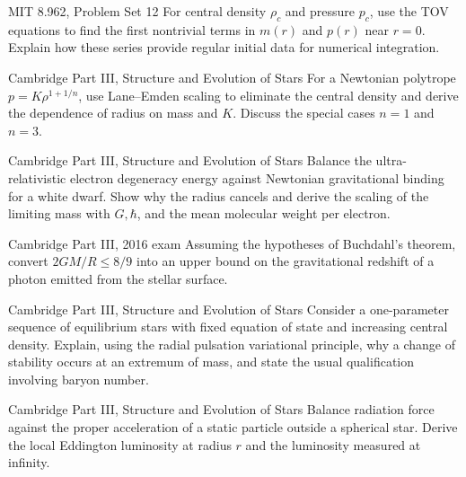 \begin{exercise}{MIT 8.962, Problem Set 12}
For central density \(\rho_c\) and pressure \(p_c\), use the TOV equations to
find the first nontrivial terms in \(m(r)\) and \(p(r)\) near \(r=0\).
Explain how these series provide regular initial data for numerical
integration.
\end{exercise}

\begin{exercise}{Cambridge Part III, Structure and Evolution of Stars}
For a Newtonian polytrope \(p=K\rho^{1+1/n}\), use Lane--Emden scaling to
eliminate the central density and derive the dependence of radius on mass and
\(K\).  Discuss the special cases \(n=1\) and \(n=3\).
\end{exercise}

\begin{exercise}{Cambridge Part III, Structure and Evolution of Stars}
Balance the ultra-relativistic electron degeneracy energy against Newtonian
gravitational binding for a white dwarf.  Show why the radius cancels and
derive the scaling of the limiting mass with \(G,\hbar\), and the mean
molecular weight per electron.
\end{exercise}

\begin{exercise}{Cambridge Part III, 2016 exam}
Assuming the hypotheses of Buchdahl's theorem, convert
\(2GM/R\leq8/9\) into an upper bound on the gravitational redshift of a photon
emitted from the stellar surface.
\end{exercise}

\begin{exercise}{Cambridge Part III, Structure and Evolution of Stars}
Consider a one-parameter sequence of equilibrium stars with fixed equation of
state and increasing central density.  Explain, using the radial pulsation
variational principle, why a change of stability occurs at an extremum of
mass, and state the usual qualification involving baryon number.
\end{exercise}

\begin{exercise}{Cambridge Part III, Structure and Evolution of Stars}
Balance radiation force against the proper acceleration of a static particle
outside a spherical star.  Derive the local Eddington luminosity at radius
\(r\) and the luminosity measured at infinity.
\end{exercise}

